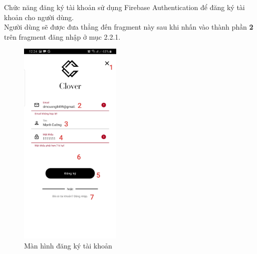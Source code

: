 \documentclass[12pt]{article}
\begin{document}
\indent Chức năng đăng ký tài khoản sử dụng Firebase Authentication để đăng ký tài khoản cho người dùng.\\

\indent Người dùng sẽ được đưa thẳng đến fragment này sau khi nhấn vào thành phần \textbf{2} trên fragment đăng nhập ở mục 2.2.1.

\begin{figure}[H]
    \centering
    \includegraphics[height=10cm]{images/10.png}
    \caption{Màn hình đăng ký tài khoản}
\end{figure}
\end{document}
